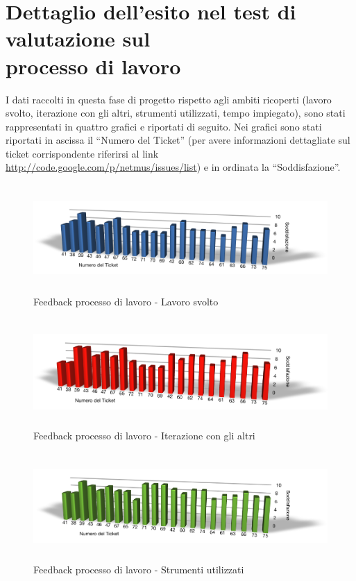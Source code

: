 \section{Dettaglio dell'esito nel test di valutazione sul\\ processo di lavoro}
I dati raccolti in questa fase di progetto rispetto agli ambiti ricoperti
(lavoro svolto, iterazione con gli altri, strumenti utilizzati, tempo
impiegato), sono stati rappresentati in quattro grafici e riportati di seguito.
Nei grafici sono stati riportati in ascissa il ``Numero del Ticket'' (per avere
informazioni dettagliate sul ticket corrispondente riferirsi al link
\url{http://code.google.com/p/netmus/issues/list}) e in ordinata la
``Soddisfazione''.

\begin{figure}[htbp]
  \centering
  \includegraphics[height=4.1cm]{GraficiFeedbackTicket/LavoroSvolto.png}
\caption{Feedback processo di lavoro - Lavoro svolto}
\end{figure}

\begin{figure}[htbp]
  \centering
  \includegraphics[height=4.1cm]{GraficiFeedbackTicket/IterazioneConGliAltri.png}
\caption{Feedback processo di lavoro - Iterazione con gli altri}
\end{figure}

\begin{figure}[htbp]
  \centering
  \includegraphics[height=4.1cm]{GraficiFeedbackTicket/Strumenti.png}
\caption{Feedback processo di lavoro - Strumenti utilizzati}
\end{figure}

